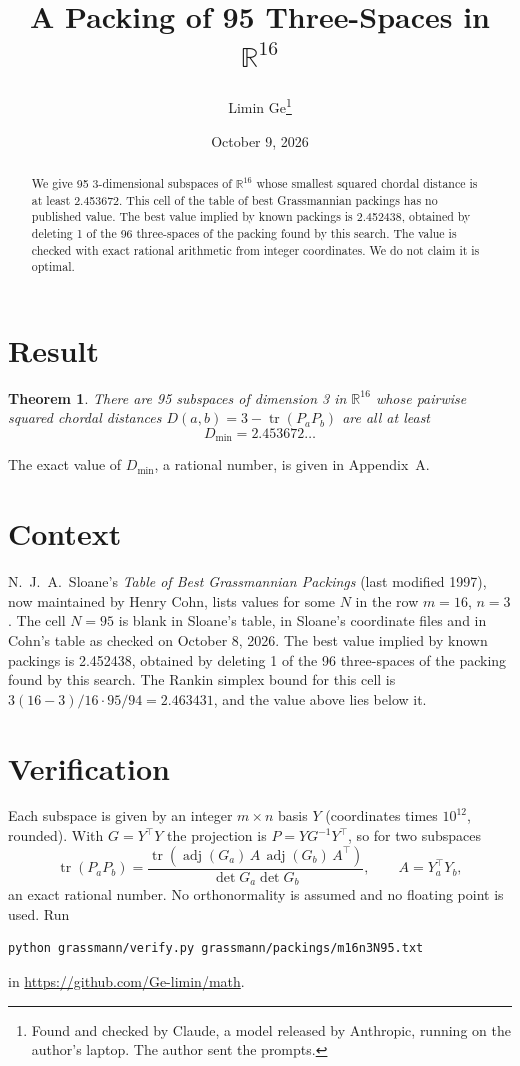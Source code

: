 \documentclass[11pt,a4paper]{article}
\title{A Packing of 95 Three-Spaces in $\mathbb{R}^{16}$}
\author{Limin Ge\thanks{Found and checked by Claude, a model released by Anthropic, running on the author's laptop. The author sent the prompts.}}
\date{October 9, 2026}
\newtheorem*{theorem}{Theorem}
\begin{document}
\maketitle
\begin{abstract}
We give 95 3-dimensional subspaces of $\mathbb{R}^{16}$ whose smallest squared chordal distance is at least 2.453672. This cell of the table of best Grassmannian packings has no published value. The best value implied by known packings is 2.452438, obtained by deleting 1 of the 96 three-spaces of the packing found by this search. The value is checked with exact rational arithmetic from integer coordinates. We do not claim it is optimal.
\end{abstract}

\section{Result}
\begin{theorem}
There are 95 subspaces of dimension 3 in $\mathbb{R}^{16}$ whose pairwise squared chordal distances $D(a,b) = 3 - \operatorname{tr}(P_aP_b)$ are all at least
\[ D_{\min} = 2.453672\ldots \]
\end{theorem}
The exact value of $D_{\min}$, a rational number, is given in Appendix~A.


\section{Context}
N.~J.~A.~Sloane's \emph{Table of Best Grassmannian Packings} (last modified 1997), now maintained by Henry Cohn, lists values for some $N$ in the row $m=16$, $n=3$. The cell $N=95$ is blank in Sloane's table, in Sloane's coordinate files and in Cohn's table as checked on October 8, 2026. The best value implied by known packings is 2.452438, obtained by deleting 1 of the 96 three-spaces of the packing found by this search. The Rankin simplex bound for this cell is $3(16-3)/16\cdot 95/94 = 2.463431$, and the value above lies below it.


\section{Verification}
Each subspace is given by an integer $m\times n$ basis $Y$ (coordinates times $10^{12}$, rounded). With $G=Y^\top Y$ the projection is $P=YG^{-1}Y^\top$, so for two subspaces
\[ \operatorname{tr}(P_aP_b)=\frac{\operatorname{tr}(\operatorname{adj}(G_a)\,A\,\operatorname{adj}(G_b)\,A^\top)}{\det G_a\det G_b},\qquad A=Y_a^\top Y_b, \]
an exact rational number. No orthonormality is assumed and no floating point is used. Run
\begin{verbatim}
python grassmann/verify.py grassmann/packings/m16n3N95.txt
\end{verbatim}
in \url{https://github.com/Ge-limin/math}.
\end{document}
